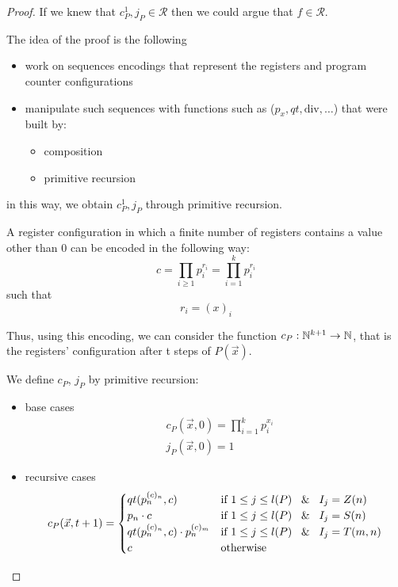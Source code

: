 \begin{theorem}
\begin{proof}

    If we knew that $ c_P^1, j_P \in \mathcal{R} $ then we could argue that $ f \in \mathcal{R} $.

    The idea of the proof is the following
    \begin{itemize}
    \item work on sequences encodings that represent the registers and program counter configurations
    \item manipulate such sequences with functions such as ($ p_x, qt, \text{div}, \dots $) that were built by:
      \begin{itemize}
      \item composition
      \item primitive recursion
      \end{itemize}
    \end{itemize}
    in this way, we obtain $c_P^1, j_P$ through primitive recursion.
    
    A register configuration in which a finite number of registers
    contains a value other than 0 can be encoded in the following way:
    \begin{equation*}
      c = \prod\limits_{i \geq 1}p_i^{r_i} = \prod\limits_{i = 1}^{k}p_i^{r_i}
    \end{equation*}
    such that
    \begin{equation*}
      r_i = (x)_i
    \end{equation*}

    Thus, using this encoding, we can consider the function $c_P:\mathbb{N}^{k+1} \rightarrow \mathbb{N}$,
    that is the registers' configuration after t steps of $P(\vec{x})$. 

    We define $c_P$, $j_P$ by primitive recursion:
    \begin{itemize}
      \item base cases \begin{align*}
        &c_P(\vec{x}, 0) = \prod\limits_{i=1}^k p_i^{x_i}\\
        &j_P(\vec{x}, 0) = 1
      \end{align*}
      \item recursive cases   
      \[
        c_P(\vec{x},t+1) = \begin{cases}
          qt(p_n^{(c)_n}, c)                    & \text{if }1 \leq j \leq l(P) \; \And \; I_j = Z(n) \\
          p_n \cdot c                           & \text{if }1 \leq j \leq l(P) \; \And \; I_j = S(n) \\
          qt(p_n^{(c)_n}, c)  \cdot p_n^{(c)_m} & \text{if }1 \leq j \leq l(P) \; \And \; I_j = T(m,n) \\
          c                                     & \text{otherwise}
        \end{cases}
      \]
  

\end{itemize}
\end{proof}
\end{theorem}
